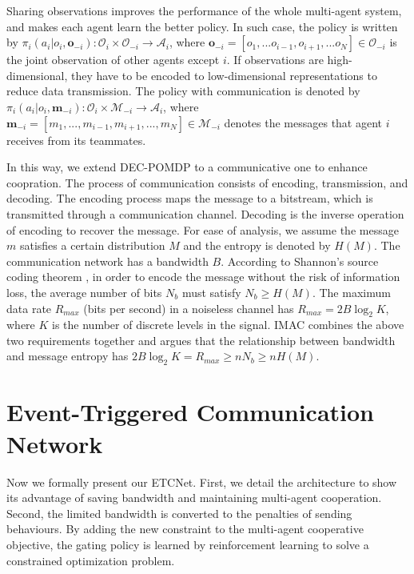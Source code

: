 \documentclass[letterpaper]{article} %
\begin{document}
Sharing observations improves the performance of the whole multi-agent system, and makes each agent learn the better policy. In such case, the policy is written by $\pi_i(a_i|o_i, \boldsymbol{o}_{-i}): \mathcal{O}_i \times \boldsymbol{\mathcal{O}}_{-i} \rightarrow \mathcal{A}_i$, where $\boldsymbol{o}_{-i} = \left[ o_{1}, ... o_{i-1}, o_{i+1}, ... o_{N}  \right] \in \boldsymbol{\mathcal{O}}_{-i}$ is the joint observation of other agents except $i$. If observations are high-dimensional, they have to be encoded to low-dimensional representations to reduce data transmission.
The policy with communication is denoted by $\pi_i(a_i|o_i, \boldsymbol{m}_{-i}): \mathcal{O}_i \times \boldsymbol{\mathcal{M}}_{-i} \rightarrow \mathcal{A}_i$, where $\boldsymbol{m}_{-i} = \left[ m_{1}, ..., m_{i-1}, m_{i+1}, ..., m_{N}  \right] \in \boldsymbol{\mathcal{M}}_{-i}$ denotes the messages that agent $i$ receives from its teammates.


In this way, we extend DEC-POMDP to a communicative one to enhance coopration. The process of communication consists of encoding, transmission, and decoding. The encoding process maps the message to a bitstream, which is transmitted through a communication channel. Decoding is the inverse operation of encoding to recover the message.
For ease of analysis, we assume the message $m$ satisfies a certain distribution $M$ and the entropy is denoted by $H(M)$. The communication network has a bandwidth $B$.
According to Shannon's source coding theorem \cite{Shannon1948}, in order to encode the message without the risk of information loss, the average number of bits $N_b$ must satisfy $ N_b \geq H(M)$.
The maximum data rate $R_{max}$ (bits per second) \cite{Freeman2004} in a noiseless channel has $R_{max} = 2B \log_2 K$, where $K$ is the number of discrete levels in the signal.
IMAC \cite{imac} combines the above two requirements together and argues that the relationship between bandwidth and message entropy has
$2B \log_2 K = R_{max} \geq n N_b \geq n H(M)$.


\section{Event-Triggered Communication Network}\label{sec:ETCNet}

Now we formally present our ETCNet. First, we detail the architecture to show its advantage of saving bandwidth and maintaining multi-agent cooperation. Second, the limited bandwidth is converted to the penalties of sending behaviours. By adding the new constraint to the multi-agent cooperative objective, the gating policy is learned by reinforcement learning to solve a constrained optimization problem.
\end{document}
